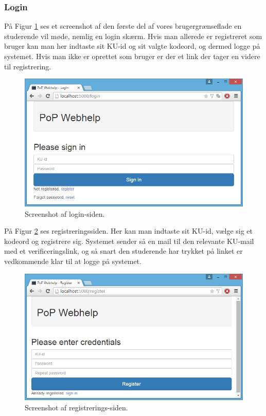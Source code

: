 \documentclass[11pt, a4paper]{article}
\begin{document}
\subsubsection{Login}
\label{subsub:screenshots_login}
På Figur \ref{fig:screenshot_login} ses et screenshot af den første del af vores brugergrænseflade en studerende vil møde, nemlig en login skærm. Hvis man allerede er registreret som bruger kan man her indtaste sit KU-id og sit valgte kodeord, og dermed logge på systemet. Hvis man ikke er oprettet som bruger er der et link der tager en videre til registrering.

\begin{figure}[htpb]
    \centering
    \includegraphics[width=1\linewidth]{figures/interface/login.png}
    \caption{Screenshot af login-siden.}
    \label{fig:screenshot_login}
\end{figure}

På Figur \ref{fig:screenshot_register} ses registreringssiden. Her kan man indtaste sit KU-id, vælge sig et kodeord og registrere sig. Systemet sender så en mail til den relevante KU-mail med et verificeringslink, og så snart den studerende har trykket på linket er vedkommende klar til at logge på systemet.

\begin{figure}[htpb]
    \centering
    \includegraphics[width=1\linewidth]{figures/interface/register.png}
    \caption{Screenshot af registrerings-siden.}
    \label{fig:screenshot_register}
\end{figure}
\end{document}
